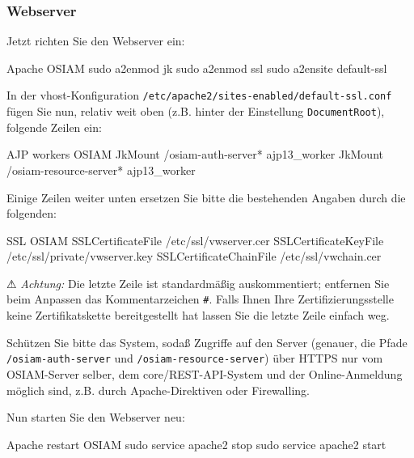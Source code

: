 \subsubsection{Webserver}\label{subsubsec:setup-osiam-apache}

\begin{minipage}{\linewidth}
Jetzt richten Sie den Webserver ein:

\begin{lstdump}{Apache OSIAM}
sudo a2enmod jk
sudo a2enmod ssl
sudo a2ensite default-ssl
\end{lstdump}
\end{minipage}

\begin{minipage}{\linewidth}
In der vhost-Konfiguration \texttt{/etc/apache2/sites-enabled/default-ssl.conf}
fügen Sie nun, relativ weit oben (z.B. hinter der Einstellung
\texttt{DocumentRoot}), folgende Zeilen ein:

\begin{lstdump}{AJP workers OSIAM}
JkMount /osiam-auth-server* ajp13_worker
JkMount /osiam-resource-server* ajp13_worker
\end{lstdump}
\end{minipage}

\begin{minipage}{\linewidth}
Einige Zeilen weiter unten ersetzen Sie bitte die bestehenden
Angaben durch die folgenden:

\begin{lstdump}{SSL OSIAM}
SSLCertificateFile /etc/ssl/vwserver.cer
SSLCertificateKeyFile /etc/ssl/private/vwserver.key
SSLCertificateChainFile /etc/ssl/vwchain.cer
\end{lstdump}

⚠ \emph{Achtung:} Die letzte Zeile ist standardmäßig auskommentiert;
entfernen Sie beim Anpassen das Kommentarzeichen \texttt{\#}. Falls
Ihnen Ihre Zertifizierungsstelle keine Zertifikatskette bereitgestellt
hat lassen Sie die letzte Zeile einfach weg.
\end{minipage}

Schützen Sie bitte das System, sodaß Zugriffe auf den Server (genauer,
die Pfade \texttt{/osiam-auth-server} und \texttt{/osiam-resource-server})
über HTTPS nur vom OSIAM-Server selber, dem core/REST-API-System und der
Online-Anmeldung möglich sind, z.B. durch Apache-Direktiven oder Firewalling.

\begin{minipage}{\linewidth}
Nun starten Sie den Webserver neu:

\begin{lstdump}{Apache restart OSIAM}
sudo service apache2 stop
sudo service apache2 start
\end{lstdump}
\end{minipage}

